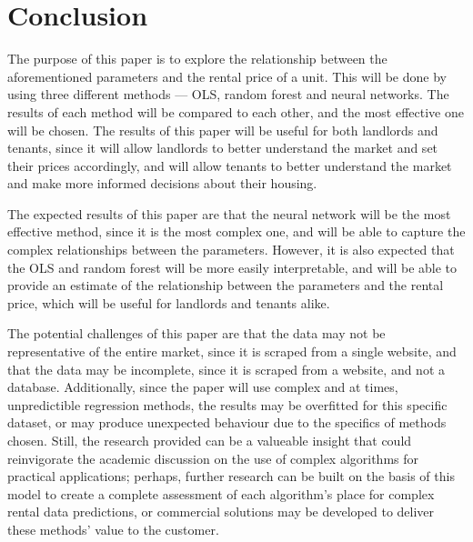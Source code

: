 \documentclass[12pt]{report}
\begin{document}
\section{Conclusion}
The purpose of this paper is to explore the relationship between the aforementioned parameters and the rental price of a unit. This will be done by using three different methods --- OLS, random forest and neural networks. The results of each method will be compared to each other, and the most effective one will be chosen. The results of this paper will be useful for both landlords and tenants, since it will allow landlords to better understand the market and set their prices accordingly, and will allow tenants to better understand the market and make more informed decisions about their housing.

The expected results of this paper are that the neural network will be the most effective method, since it is the most complex one, and will be able to capture the complex relationships between the parameters. However, it is also expected that the OLS and random forest will be more easily interpretable, and will be able to provide an estimate of the relationship between the parameters and the rental price, which will be useful for landlords and tenants alike.

The potential challenges of this paper are that the data may not be representative of the entire market, since it is scraped from a single website, and that the data may be incomplete, since it is scraped from a website, and not a database. Additionally, since the paper will use complex and at times, unpredictible regression methods, the results may be overfitted for this specific dataset, or may produce unexpected behaviour due to the specifics of methods chosen. Still, the research provided can be a valueable insight that could reinvigorate the academic discussion on the use of complex algorithms for practical applications; perhaps, further research can be built on the basis of this model to create a complete assessment of each algorithm's place for complex rental data predictions, or commercial solutions may be developed to deliver these methods' value to the customer.
\printbibliography
\end{document}
